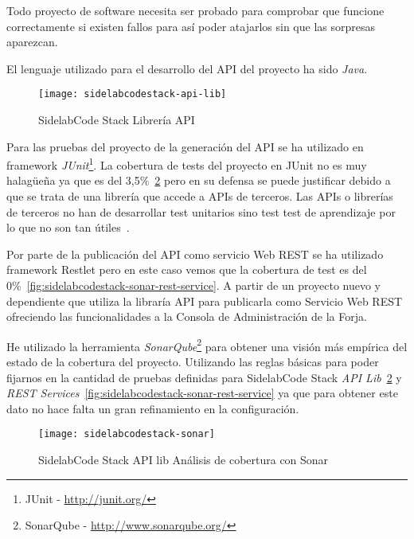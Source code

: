 \par Todo proyecto de software necesita ser probado para comprobar que funcione correctamente si existen fallos para así poder atajarlos sin que las sorpresas aparezcan.

\par El lenguaje utilizado para el desarrollo del API del proyecto ha sido \emph{Java}.

\begin{figure}[H]
    \centering
    \texttt{[image: sidelabcodestack-api-lib]}
    \caption{SidelabCode Stack Librería API}
    \label{fig:sidelabcodestack-api-lib}
\end{figure}

\par Para las pruebas del proyecto de la generación del API se ha utilizado en framework \emph{JUnit}\footnote{JUnit - \url{http://junit.org/}}. La cobertura de tests del proyecto en JUnit no es muy halagüeña ya que es del 3,5\%~\ref{fig:sidelabcodestack-sonar} pero en su defensa se puede justificar debido a que se trata de una librería que accede a APIs de terceros. Las APIs o librerías de terceros no han de desarrollar test unitarios sino test test de aprendizaje por lo que no son tan útiles~\cite{clean-code}.

\par Por parte de la publicación del API como servicio Web REST se ha utilizado framework Restlet pero en este caso vemos que la cobertura de test es del 0\%~\ref{fig:sidelabcodestack-sonar-rest-service}. A partir de un proyecto nuevo y dependiente que utiliza la libraría API para publicarla como Servicio Web REST ofreciendo las funcionalidades a la Consola de Administración de la Forja.

\par He utilizado la herramienta \emph{SonarQube}\footnote{SonarQube - \url{http://www.sonarqube.org/}} para obtener una visión más empírica del estado de la cobertura del proyecto. Utilizando las reglas básicas para poder fijarnos en la cantidad de pruebas definidas para SidelabCode Stack \emph{API Lib}~\ref{fig:sidelabcodestack-sonar} y \emph{REST Services}~\ref{fig:sidelabcodestack-sonar-rest-service} ya que para obtener este dato no hace falta un gran refinamiento en la configuración.

\begin{figure}[H]
    \centering
    \texttt{[image: sidelabcodestack-sonar]}
    \caption{SidelabCode Stack API lib Análisis de cobertura con Sonar}
    \label{fig:sidelabcodestack-sonar}
\end{figure}

